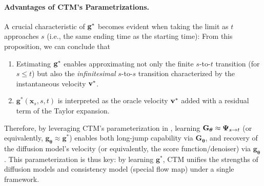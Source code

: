 \paragraph{Advantages of CTM's Parametrizations.}
A crucial characteristic of ${\mathbf{g}}^*$ becomes evident when taking the limit as $t$ approaches $s$ (i.e., the same ending time as the starting time):
From this proposition, we can conclude that
\begin{enumerate}
    \item Estimating ${\mathbf{g}}^*$ enables approximating not only the finite $s$-to-$t$ transition (for $s \le t$) but also the \textit{infinitesimal} $s$-to-$s$ transition characterized by the instantaneous velocity ${\mathbf{v}}^*$.
    \item $\mathbf{g}^*(\mathbf{x}_{s},s,t)$  is interpreted as the oracle velocity ${\mathbf{v}}^*$ added with a residual term of the Taylor expansion.
\end{enumerate}
Therefore, by leveraging CTM's parameterization in , learning $\mathbf{G}_{\bm{\theta}} \approx {\bm{\Psi}}_{s\to t}$ (or equivalently, $\mathbf{g}_{\bm{\theta}} \approx \mathbf{g}^*$) enables both long-jump capability via $\mathbf{G}_{\bm{\theta}}$, and recovery of the diffusion model’s velocity (or equivalently, the score function/denoiser) via $\mathbf{g}_{\bm{\theta}}$. This parameterization is thus key: by learning $\mathbf{g}^*$, CTM unifies the strengths of diffusion models and consistency model (special flow map) under a single framework.


